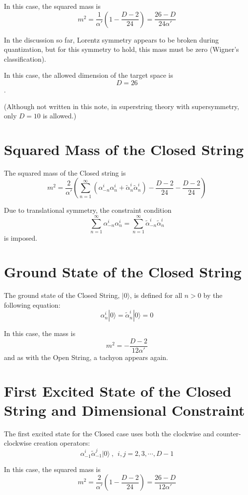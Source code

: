 \documentclass[uplatex]{jsarticle}
\begin{document}
In this case, the squared mass is
$$
	m^{2}
	=
	\frac{1}{\alpha'}
	\left(
	1 - \frac{D-2}{24}
	\right)
	=
	\frac{26 - D}{24 \alpha'}
$$

In the discussion so far, Lorentz symmetry appears to be broken during quantization, but for this symmetry to hold, this mass must be zero (Wigner's classification).

In this case, the allowed dimension of the target space is
$$
	D=26
$$
.

(Although not written in this note, in superstring theory with supersymmetry, only
$D=10$
is allowed.)

\section{Squared Mass of the Closed String}

The squared mass of the Closed string is
$$
	m^{2}
	=
	\frac{2}{\alpha'}
	\left(
	\sum^{\infty}_{n=1}
		(
		\alpha^{i}_{-n} \alpha^{i}_{n}
		+
		\tilde{\alpha}^{i}_{n} \tilde{\alpha}^{i}_{n}
		)
	-
	\frac{D-2}{24}
	-
	\frac{D-2}{24}
	\right)
$$

Due to translational symmetry, the constraint condition
$$
	\sum^{\infty}_{n=1}
	\alpha^{i}_{-n} \alpha^{i}_{n}
	=
	\sum^{\infty}_{n=1}
	\tilde{\alpha}^{i}_{-n} \tilde{\alpha}^{i}_{n}
$$
is imposed.

\section{Ground State of the Closed String}

The ground state of the Closed String,
$| 0 \rangle$,
is defined for all
$n>0$
by the following equation:
$$
	\alpha^{i}_{n}
	| 0 \rangle
	=
	\tilde{\alpha}^{i}_{n}
	| 0 \rangle
	=
	0
$$

In this case, the mass is
$$
	m^{2}
	= - \frac{D-2}{12 \alpha'}
$$
and as with the Open String, a tachyon appears again.

\section{First Excited State of the Closed String and Dimensional Constraint}

The first excited state for the Closed case uses both the clockwise and counter-clockwise creation operators:
$$
	\alpha^{i}_{-1}
	\tilde{\alpha}^{j}_{-1}
	| 0 \rangle
	\ , \ \ i, j = 2,3,\cdots, D-1
$$

In this case, the squared mass is
$$
	m^{2}
	=
	\frac{2}{\alpha'}
	\left(
	1 - \frac{D-2}{24}
	\right)
	=
	\frac{26 - D}{12 \alpha'}
$$
\end{document}
